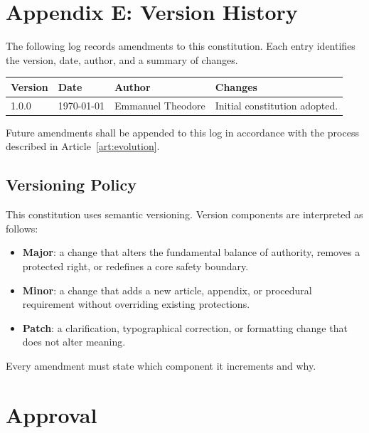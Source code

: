 \documentclass[12pt,letterpaper]{article}
\begin{document}
\section{Appendix E: Version History}
\label{appendix:version-history}

The following log records amendments to this constitution. Each entry identifies the version, date, author, and a summary of changes.

\begin{longtable}{|p{2cm}|p{2.5cm}|p{3cm}|p{6cm}|}
\hline
\textbf{Version} & \textbf{Date} & \textbf{Author} & \textbf{Changes} \\
\hline
\endhead
1.0.0 & \today & Emmanuel Theodore & Initial constitution adopted. \\
\hline
\end{longtable}

Future amendments shall be appended to this log in accordance with the process described in Article~\ref{art:evolution}.

\subsection{Versioning Policy}

This constitution uses semantic versioning. Version components are interpreted as follows:

\begin{itemize}
    \item \textbf{Major}: a change that alters the fundamental balance of authority, removes a protected right, or redefines a core safety boundary.
    \item \textbf{Minor}: a change that adds a new article, appendix, or procedural requirement without overriding existing protections.
    \item \textbf{Patch}: a clarification, typographical correction, or formatting change that does not alter meaning.
\end{itemize}

Every amendment must state which component it increments and why.

\section*{Approval}
\end{document}
